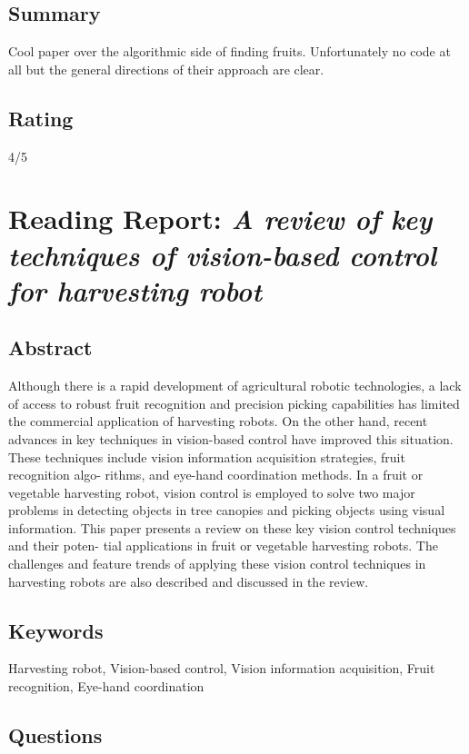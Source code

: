 \documentclass{article}
\begin{document}
\subsection*{Summary}
Cool paper over the algorithmic side of finding fruits.  Unfortunately no code at all but the general directions of their approach are clear.

\subsection*{Rating}
4/5



\section{Reading Report: \emph{A review of key techniques of vision-based control for harvesting robot}}
\cite{Zhao2016}

\subsection*{Abstract}
Although there is a rapid development of agricultural robotic technologies, a lack of access to robust fruit
recognition and precision picking capabilities has limited the commercial application of harvesting
robots. On the other hand, recent advances in key techniques in vision-based control have improved this
situation. These techniques include vision information acquisition strategies, fruit recognition algo-
rithms, and eye-hand coordination methods. In a fruit or vegetable harvesting robot, vision control is
employed to solve two major problems in detecting objects in tree canopies and picking objects using
visual information. This paper presents a review on these key vision control techniques and their poten-
tial applications in fruit or vegetable harvesting robots. The challenges and feature trends of applying
these vision control techniques in harvesting robots are also described and discussed in the review.


\subsection*{Keywords}
Harvesting robot, Vision-based control, Vision information acquisition, Fruit recognition, Eye-hand coordination


\subsection*{Questions}
\end{document}

